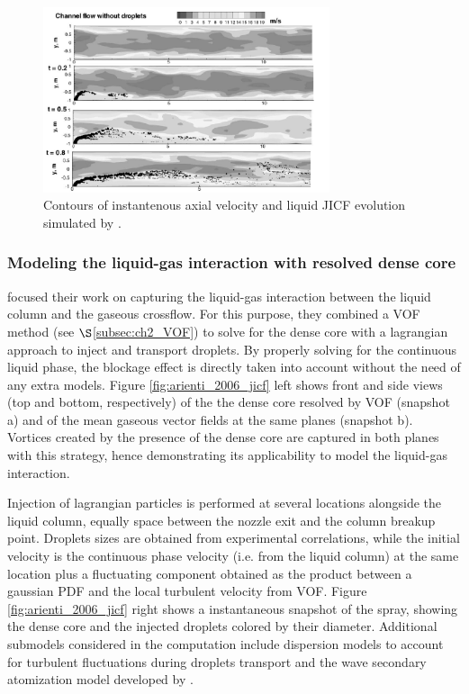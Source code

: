 \begin{figure}[ht]
    \centering
    \includegraphics[width=0.75\textwidth]{./part1_numerical_approaches/figures_ch3/apte_2003_jicf}
       \centering
    \caption{Contours of instantenous axial velocity and liquid JICF evolution simulated by .}
    \label{fig:apte_2003_jicf}
\end{figure}

\subsubsection*{Modeling the liquid-gas interaction with resolved dense core }

 focused their work on capturing the liquid-gas interaction between the liquid column and the gaseous crossflow. For this purpose, they combined a VOF method (see $\S$\ref{subsec:ch2_VOF}) to solve for the dense core with a lagrangian approach to inject and transport droplets. By properly solving for the continuous liquid phase, the blockage effect is directly taken into account without the need of any extra models. Figure \ref{fig:arienti_2006_jicf} left shows front and side views (top and bottom, respectively) of the the dense core resolved by VOF (snapshot a) and of the mean gaseous vector fields at the same planes (snapshot b). Vortices created by the presence of the dense core are captured in both planes with this strategy, hence demonstrating its applicability to model the liquid-gas interaction.

Injection of lagrangian particles is performed at several locations alongside the liquid column, equally space between the nozzle exit and the column breakup point. Droplets sizes are obtained from experimental correlations, while the initial velocity is the continuous phase velocity (i.e. from the liquid column) at the same location plus a fluctuating component obtained as the product between a gaussian PDF and the local turbulent velocity from VOF. Figure \ref{fig:arienti_2006_jicf} right shows a instantaneous snapshot of the spray, showing the dense core and the injected droplets colored by their diameter. Additional submodels considered in the computation include dispersion models to account for turbulent fluctuations during droplets transport  and the wave secondary atomization model developed by .


